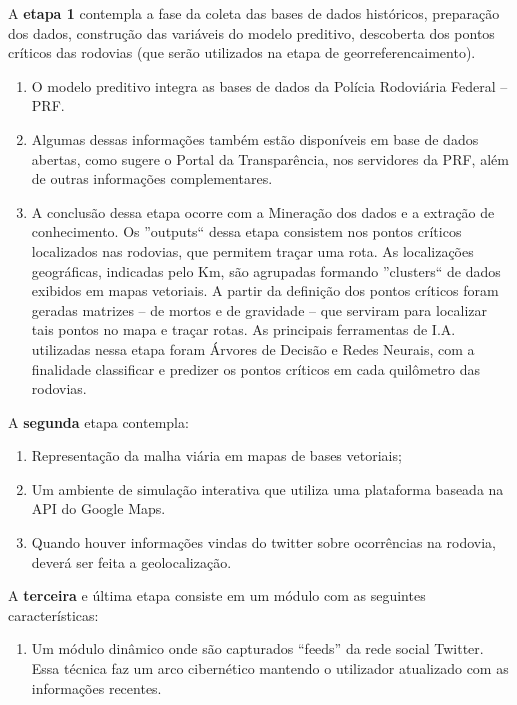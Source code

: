 A \textbf{etapa 1} contempla a fase da coleta das bases de dados históricos, preparação dos dados, construção das variáveis do modelo preditivo, descoberta dos pontos críticos das rodovias (que serão utilizados na etapa de georreferencaimento).
  \begin{enumerate}
    \item O modelo preditivo integra as bases de dados da Polícia Rodoviária Federal -- PRF.
 
    \item Algumas dessas informações também estão disponíveis em base de dados abertas, como sugere o Portal da Transparência, nos servidores da PRF, além de outras informações complementares.
    \item A conclusão dessa etapa ocorre com a Mineração dos dados e a extração de conhecimento.
	  Os ''outputs`` dessa etapa consistem nos pontos críticos localizados nas rodovias, que permitem traçar uma rota. 
	  As localizações geográficas, indicadas pelo Km, são agrupadas formando ''clusters`` de dados exibidos em mapas vetoriais. 
	  A partir da definição dos pontos críticos foram geradas matrizes -- de mortos e de gravidade -- que serviram para localizar tais pontos no mapa e traçar rotas.
	  As principais ferramentas de I.A. utilizadas nessa etapa foram Árvores de Decisão e Redes Neurais, com a finalidade classificar e predizer os pontos críticos em cada quilômetro das rodovias.\\
\end{enumerate}
  
A \textbf{segunda} etapa contempla:
 \begin{enumerate}
    \item Representação da malha viária em mapas de bases vetoriais;
    \item Um ambiente de simulação interativa que utiliza uma plataforma baseada na API do Google Maps.
    \item Quando houver informações vindas do twitter sobre ocorrências na rodovia, deverá ser feita a geolocalização. 
  \end{enumerate}

A \textbf{terceira} e última etapa consiste em um módulo com as seguintes características:
  \begin{enumerate}
     \item Um módulo dinâmico onde são capturados ``feeds'' da rede social Twitter. 
	Essa técnica faz um arco cibernético mantendo o utilizador atualizado com as informações recentes.
  \end{enumerate}


